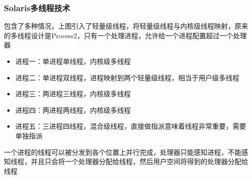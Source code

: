 \documentclass[cs4size,a4paper,10pt]{ctexart}
\begin{document}
	\subsubsection{Solaris多线程技术}
	\begin{figure}[H]
		\centering
	\end{figure}
	包含了多种情况，上图引入了轻量级线程，将轻量级线程与内核级线程映射，原来的多线程设计是Process2，只有一个处理进程，允许给一个进程配置超过一个处理器
	\begin{itemize}
		\item 进程一：单进程单线程，内核级多线程
		\item 进程二：单进程双线程，进程映射到两个轻量级线程，相当于用户级多线程
		\item 进程三：两进程三线程，内核级多线程
		\item 进程四：两进程两线程，内核级多线程
		\item 进程五：三进程四线程，混合级线程，直接做指派意味着线程非常重要，需要单独指派
	\end{itemize}

	一个进程的线程可以被分发到各个位置上并行完成，处理器只能感知进程，不能感知线程，并且只会将一个处理器分配给线程，然后用户空间将得到的处理器分配给线程
\end{document}
